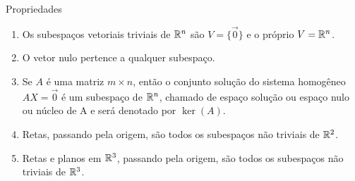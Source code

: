 \begin{frame}[label=lild]{}
\begin{block}{Propriedades}
\begin{enumerate}
\item Os subespaços vetoriais triviais de $\mathbb{R}^n$ são $V=\{\vec{0}\}$ e o próprio $V=\mathbb{R}^n$.

\item O vetor nulo pertence a qualquer subespaço.

\item Se $A$ é uma matriz $m\times n$, então o conjunto solução do sistema homogêneo $AX=\vec{0}$ é um subespaço de $\mathbb{R}^n$, chamado de {\color{blue}espaço solução} ou {\color{blue}espaço nulo} ou {\color{blue}núcleo de A} e será denotado por {\color{blue} $\ker(A)$}.

\item Retas, passando pela origem, são todos os subespaços não triviais de $\mathbb{R}^2$.

\item Retas e planos em $\mathbb{R}^3$, passando pela origem, são todos os subespaços não triviais de $\mathbb{R}^3$.

\end{enumerate}
\end{block}


\end{frame}

